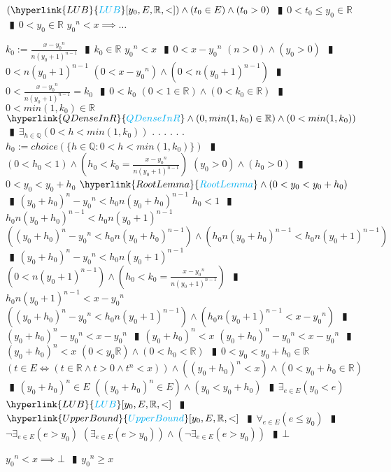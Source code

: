 \documentclass{book}
\newcommand{\rf}[1]{\hyperlink{#1}{\textcolor{cyan}{#1}}}
\newcommand{\abr}{:=}
\newcommand{\cont}{\phantom{.}. . .\phantom{.}}
\newcommand{\pipe}{$\phantom{(}\vrectangleblack\phantom{)}$}
\begin{document}
\begin{enumerate}
\begin{enumerate}
    \lit $(\rf{LUB}[y_0, E, \mathbb{R}, <]) \land (t_0 \in E) \land (t_0 > 0)$ \pipe $0 < t_0 \leq y_0 \in \mathbb{R}$ \pipe $0 < y_0 \in \mathbb{R}$
    \lit ${y_0}^n < x \implies \ldots$
    \begin{enumerate}
      \lit $k_0 \abr \frac{x - {y_0}^n}{n (y_0 + 1)^{n - 1}}$ \pipe $k_0 \in \mathbb{R}$
      \lit ${y_0}^n < x$ \pipe $0 < x - {y_0}^n$
      \lit $(n > 0) \land (y_0 > 0)$ \pipe $0 < n (y_0 + 1)^{n - 1}$
      \lit $(0 < x - {y_0}^n) \land (0 < n (y_0 + 1)^{n - 1})$ \pipe $0 < \frac{x - {y_0}^n}{n (y_0 + 1)^{n - 1}} = k_0$ \pipe $0 < k_0$
      \lit $(0 < 1 \in \mathbb{R}) \land (0 < k_0 \in \mathbb{R})$ \pipe $0 < min(1, k_0) \in \mathbb{R}$ 
      \lit $\rf{QDenseInR} \land (0, min(1, k_0) \in \mathbb{R}) \land (0 < min(1, k_0))$ \pipe $\exists_{h \in \mathbb{Q}}(0 < h < min(1, k_0))$ \cont
      \lit \cont $h_0 \abr choice(\{h \in \mathbb{Q} : 0 < h < min(1, k_0)\})$ \pipe $(0 < h_0 < 1) \land (h_0 < k_0 = \frac{x - {y_0}^n}{n (y_0 + 1)^{n - 1}})$
      \lit $(y_0 > 0) \land (h_0 > 0)$ \pipe $0 < y_0 < y_0 + h_0$
      \lit $\rf{RootLemma} \land (0 < y_0 < y_0 + h_0)$ \pipe $(y_0 + h_0)^n - {y_0}^n < h_0 n (y_0 + h_0)^{n - 1}$
      \lit $h_0 < 1$ \pipe $h_0 n (y_0 + h_0)^{n - 1} < h_0 n (y_0 + 1)^{n - 1}$
      \lit $((y_0 + h_0)^n - {y_0}^n < h_0 n (y_0 + h_0)^{n - 1}) \land (h_0 n (y_0 + h_0)^{n - 1} < h_0 n (y_0 + 1)^{n - 1})$ \pipe $(y_0 + h_0)^n - {y_0}^n < h_0 n (y_0 + 1)^{n - 1}$
      \lit $(0 < n (y_0 + 1)^{n - 1}) \land (h_0 < k_0 = \frac{x - {y_0}^n}{n (y_0 + 1)^{n - 1}})$ \pipe $h_0 n (y_0 + 1)^{n - 1} < x - {y_0}^n$
      \lit $((y_0 + h_0)^n - {y_0}^n < h_0 n (y_0 + 1)^{n - 1}) \land (h_0 n (y_0 + 1)^{n - 1} < x - {y_0}^n)$ \pipe $(y_0 + h_0)^n - {y_0}^n < x - {y_0}^n$ \pipe $(y_0 + h_0)^n < x$
      \lit $(y_0 + h_0)^n - {y_0}^n < x - {y_0}^n$ \pipe $(y_0 + h_0)^n < x$
      \lit $(0 < y_0 \mathbb{R}) \land (0 < h_0 < \mathbb{R})$ \pipe $0 < y_0 < y_0 + h_0 \in \mathbb{R}$
      \lit $(t \in E \iff (t \in \mathbb{R} \land t > 0 \land t^n < x)) \land ((y_0 + h_0)^n < x) \land (0 < y_0 + h_0 \in \mathbb{R})$ \pipe $(y_0 + h_0)^n \in E$
      \lit $((y_0 + h_0)^n \in E) \land (y_0 < y_0 + h_0)$ \pipe $\exists_{e \in E}(y_0 < e)$
      \lit $\rf{LUB}[y_0, E, \mathbb{R}, <]$ \pipe $\rf{UpperBound}[y_0, E, \mathbb{R}, <]$ \pipe $\forall_{e \in E}(e \leq y_0)$ \pipe $\lnot \exists_{e \in E}(e > y_0)$
      \lit $(\exists_{e \in E}(e > y_0)) \land (\lnot \exists_{e \in E}(e > y_0))$ \pipe $\bot$
    \end{enumerate}
    \lit ${y_0}^n < x \implies \bot$ \pipe ${y_0}^n \geq x$

\end{enumerate}
\end{enumerate}
\end{document}
